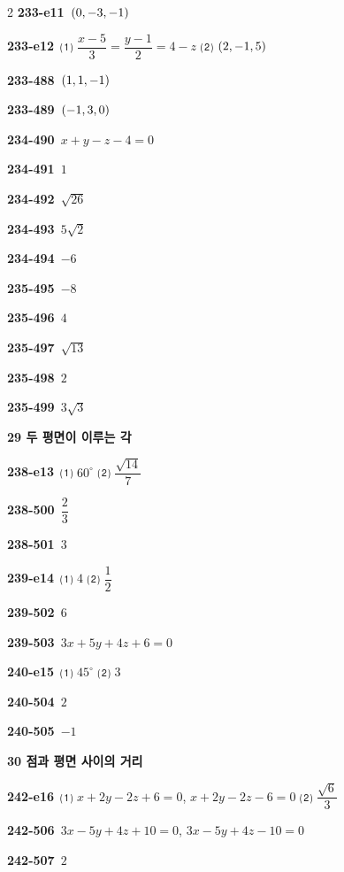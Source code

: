 \documentclass[10pt,a4paper]{article}
\begin{document}
\begin{multicols}{2}
\noindent\textbf{233-e11}\ $(0{,}\mkern3mu\mathopen{}-3{,}\mkern3mu\mathopen{}-1)$\par
\noindent\textbf{233-e12}\ ⑴ $\dfrac{x-5}{3}=\dfrac{y-1}{2}=4-z$ ⑵ $(2{,}\mkern3mu\mathopen{}-1{,}\mkern3mu\mathopen{}5)$\par
\noindent\textbf{233-488}\ $(1{,}\mkern3mu\mathopen{}1{,}\mkern3mu\mathopen{}-1)$\par
\noindent\textbf{233-489}\ $(-1{,}\mkern3mu\mathopen{}3{,}\mkern3mu\mathopen{}0)$\par
\noindent\textbf{234-490}\ $x+y-z-4=0$\par
\noindent\textbf{234-491}\ $1$\par
\noindent\textbf{234-492}\ $\sqrt{26}$\par
\noindent\textbf{234-493}\ $5\sqrt{2}$\par
\noindent\textbf{234-494}\ $-6$\par
\noindent\textbf{235-495}\ $-8$\par
\noindent\textbf{235-496}\ $4$\par
\noindent\textbf{235-497}\ $\sqrt{13}$\par
\noindent\textbf{235-498}\ $2$\par
\noindent\textbf{235-499}\ $3\sqrt{3}$\par
\noindent\textbf{29 두 평면이 이루는 각}\par\smallskip
\noindent\textbf{238-e13}\ ⑴ $60^\circ$ ⑵ $\dfrac{\sqrt{14}}{7}$\par
\noindent\textbf{238-500}\ $\dfrac{2}{3}$\par
\noindent\textbf{238-501}\ $3$\par
\noindent\textbf{239-e14}\ ⑴ $4$ ⑵ $\dfrac{1}{2}$\par
\noindent\textbf{239-502}\ $6$\par
\noindent\textbf{239-503}\ $3x+5y+4z+6=0$\par
\noindent\textbf{240-e15}\ ⑴ $45^\circ$ ⑵ $3$\par
\noindent\textbf{240-504}\ $2$\par
\noindent\textbf{240-505}\ $-1$\par
\noindent\textbf{30 점과 평면 사이의 거리}\par\smallskip
\noindent\textbf{242-e16}\ ⑴ $x+2y-2z+6=0$, $x+2y-2z-6=0$ ⑵ $\dfrac{\sqrt{6}}{3}$\par
\noindent\textbf{242-506}\ $3x-5y+4z+10=0$, $3x-5y+4z-10=0$\par
\noindent\textbf{242-507}\ $2$\par

\end{multicols}
\end{document}
